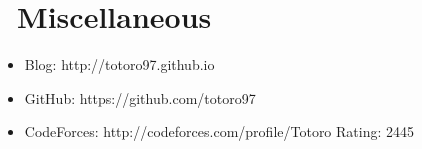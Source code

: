 \documentclass{resume}
\begin{document}
\section{\faInfo\ Miscellaneous}
\begin{itemize}[parsep=0.5ex]
  \item Blog: http://totoro97.github.io
  \item GitHub: https://github.com/totoro97
  \item CodeForces: http://codeforces.com/profile/Totoro Rating: 2445
\end{itemize}

%
%
\end{document}
